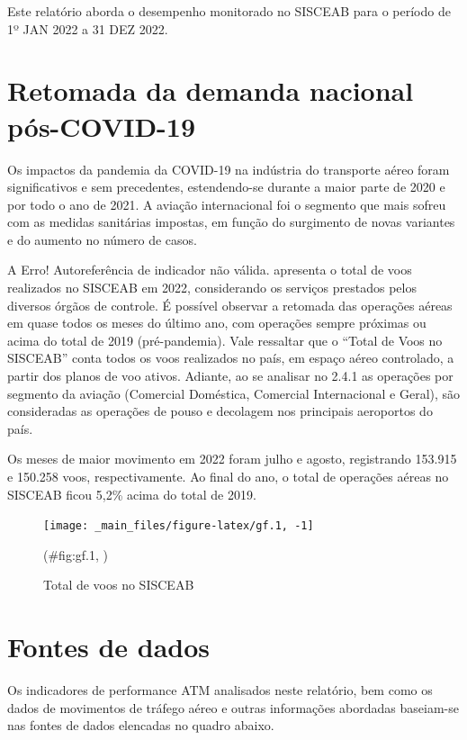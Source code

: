 \documentclass[
]{book}
\theoremstyle{definition}
\theoremstyle{definition}
\theoremstyle{definition}
\theoremstyle{definition}
\theoremstyle{remark}
\begin{document}
Este relatório aborda o desempenho monitorado no SISCEAB para o período de 1º JAN 2022 a 31 DEZ 2022.

\hypertarget{retomada-da-demanda-nacional-puxf3s-covid-19}{%
\section{Retomada da demanda nacional pós-COVID-19}\label{retomada-da-demanda-nacional-puxf3s-covid-19}}

Os impactos da pandemia da COVID-19 na indústria do transporte aéreo foram significativos e sem precedentes, estendendo-se durante a maior parte de 2020 e por todo o ano de 2021. A aviação internacional foi o segmento que mais sofreu com as medidas sanitárias impostas, em função do surgimento de novas variantes e do aumento no número de casos.

A Erro! Autoreferência de indicador não válida. apresenta o total de voos realizados no SISCEAB em 2022, considerando os serviços prestados pelos diversos órgãos de controle. É possível observar a retomada das operações aéreas em quase todos os meses do último ano, com operações sempre próximas ou acima do total de 2019 (pré-pandemia). Vale ressaltar que o ``Total de Voos no SISCEAB'' conta todos os voos realizados no país, em espaço aéreo controlado, a partir dos planos de voo ativos. Adiante, ao se analisar no 2.4.1 as operações por segmento da aviação (Comercial Doméstica, Comercial Internacional e Geral), são consideradas as operações de pouso e decolagem nos principais aeroportos do país.

Os meses de maior movimento em 2022 foram julho e agosto, registrando 153.915 e 150.258 voos, respectivamente. Ao final do ano, o total de operações aéreas no SISCEAB ficou 5,2\% acima do total de 2019.

\begin{figure}

{\centering \texttt{[image: \_main\_files/figure-latex/gf.1, -1]} 

}

\caption{Total de voos no SISCEAB}(\#fig:gf.1, )
\end{figure}

\hypertarget{fontes-de-dados}{%
\section{Fontes de dados}\label{fontes-de-dados}}

Os indicadores de performance ATM analisados neste relatório, bem como os dados de movimentos de tráfego aéreo e outras informações abordadas baseiam-se nas fontes de dados elencadas no quadro abaixo.
\end{document}
